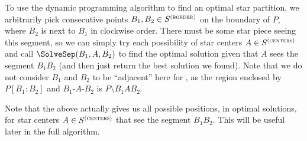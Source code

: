 \documentclass{theoretics}
\newcommand\Scen{S^{\textsc{(centers)}}}
\newcommand\Sbor{S^{\textsc{(border)}}}
\begin{document}

To use the dynamic programming algorithm to find an optimal star partition, we arbitrarily pick consecutive points $B_1, B_2\in \Sbor$ on the boundary of $P$, where $B_2$ is next to $B_1$ in clockwise order. 
There must be some star piece seeing this segment, so we can simply try each possibility of star centers $A\in \Scen$ and call $\SolveSep(B_1,A,B_2)$ to find the optimal solution given that $A$ sees the segment $B_1B_2$ (and then just return the best solution we found). 
Note that we do not consider $B_1$ and $B_2$ to be ``adjacent'' here for , as the region enclosed by $P[B_1:B_2]$ and $B_1$-$A$-$B_2$ is $P \setminus B_1AB_2$. 

\begin{observation}
\label{obs:multiple-solutions}
Note that the above actually gives us all possible positions, in optimal solutions, for star centers $A\in\Scen$ that see the segment $B_1B_2$. This will be useful later in the full algorithm.
\end{observation}
\end{document}
